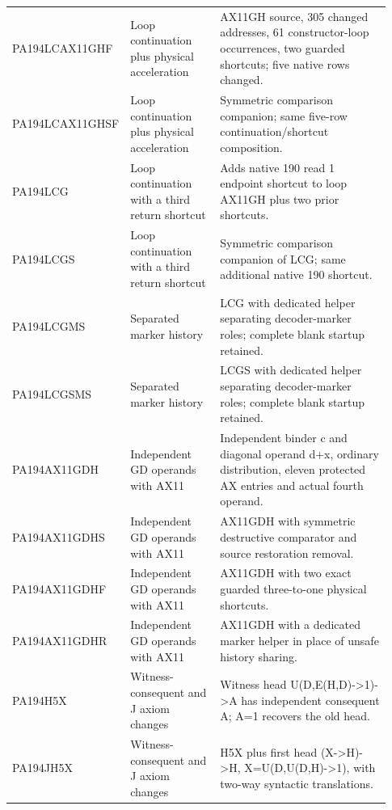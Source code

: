 \begin{longtable}{>{\raggedright\arraybackslash}p{0.23\linewidth}>{\raggedright\arraybackslash}p{0.24\linewidth}>{\raggedright\arraybackslash}p{0.46\linewidth}}
PA194LCAX11GHF&Loop continuation plus physical acceleration&AX11GH source, 305 changed addresses, 61 constructor-loop occurrences, two guarded shortcuts; five native rows changed.\\[5pt]
PA194LCAX11GHSF&Loop continuation plus physical acceleration&Symmetric comparison companion; same five-row continuation/\allowbreak{}shortcut composition.\\[5pt]
PA194LCG&Loop continuation with a third return shortcut&Adds native 190 read 1 endpoint shortcut to loop AX11GH plus two prior shortcuts.\\[5pt]
PA194LCGS&Loop continuation with a third return shortcut&Symmetric comparison companion of LCG; same additional native 190 shortcut.\\[5pt]
PA194LCGMS&Separated marker history&LCG with dedicated helper separating decoder-marker roles; complete blank startup retained.\\[5pt]
PA194LCGSMS&Separated marker history&LCGS with dedicated helper separating decoder-marker roles; complete blank startup retained.\\[5pt]
PA194AX11GDH&Independent GD operands with AX11&Independent binder c and diagonal operand d+x, ordinary distribution, eleven protected AX entries and actual fourth operand.\\[5pt]
PA194AX11GDHS&Independent GD operands with AX11&AX11GDH with symmetric destructive comparator and source restoration removal.\\[5pt]
PA194AX11GDHF&Independent GD operands with AX11&AX11GDH with two exact guarded three-to-one physical shortcuts.\\[5pt]
PA194AX11GDHR&Independent GD operands with AX11&AX11GDH with a dedicated marker helper in place of unsafe history sharing.\\[5pt]
PA194H5X&Witness-consequent and J axiom changes&Witness head U(D,E(H,D)->1)->A has independent consequent A; A=1 recovers the old head.\\[5pt]
PA194JH5X&Witness-consequent and J axiom changes&H5X plus first head (X->H)->H, X=U(D,U(D,H)->1), with two-way syntactic translations.\\[5pt]
\end{longtable}\endgroup

